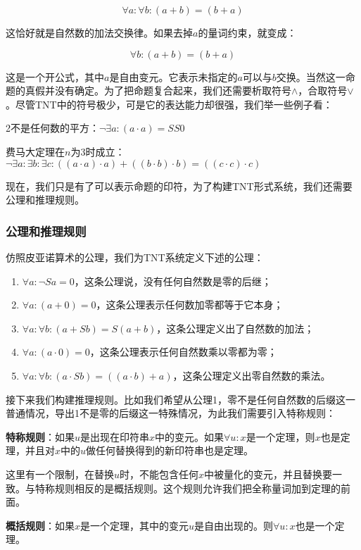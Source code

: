 \documentclass{article}
\begin{document}
\[
\forall a : \forall b : (a + b) = (b + a)
\]

这恰好就是自然数的加法交换律。如果去掉$a$的量词约束，就变成：

\[
\forall b : (a + b) = (b + a)
\]

这是一个开公式，其中$a$是自由变元。它表示未指定的$a$可以与$b$交换。当然这一命题的真假并没有确定。为了把命题复合起来，我们还需要析取符号$\land$，合取符号$\lor$。尽管TNT中的符号极少，可是它的表达能力却很强，我们举一些例子看：

2不是任何数的平方：$\lnot \exists a : (a \cdot a) = SS0$

费马大定理在$n$为3时成立：$\lnot \exists a : \exists b : \exists c : ((a \cdot a) \cdot a) + ((b \cdot b) \cdot b) = ((c \cdot c) \cdot c)$

现在，我们只是有了可以表示命题的印符，为了构建TNT形式系统，我们还需要公理和推理规则。

\subsubsection{公理和推理规则}

仿照皮亚诺算术的公理，我们为TNT系统定义下述的公理：

\begin{enumerate}
\item $\forall a : \lnot Sa = 0$，这条公理说，没有任何自然数是零的后继；
\item $\forall a: (a + 0) = 0$，这条公理表示任何数加零都等于它本身；
\item $\forall a: \forall b: (a + Sb) = S(a + b)$，这条公理定义出了自然数的加法；
\item $\forall a: (a \cdot 0) = 0$，这条公理表示任何自然数乘以零都为零；
\item $\forall a: \forall b: (a \cdot Sb) = ((a \cdot b) + a)$，这条公理定义出零自然数的乘法。
\end{enumerate}

接下来我们构建推理规则。比如我们希望从公理1，零不是任何自然数的后缀这一普通情况，导出1不是零的后缀这一特殊情况，为此我们需要引入特称规则：

\textbf{特称规则}：如果$u$是出现在印符串$x$中的变元。如果$\forall u: x$是一个定理，则$x$也是定理，并且对$x$中的$u$做任何替换得到的新印符串也是定理。

这里有一个限制，在替换$u$时，不能包含任何$x$中被量化的变元，并且替换要一致。与特称规则相反的是概括规则。这个规则允许我们把全称量词加到定理的前面。

\textbf{概括规则}：如果$x$是一个定理，其中的变元$u$是自由出现的。则$\forall u: x$也是一个定理。
\end{document}
